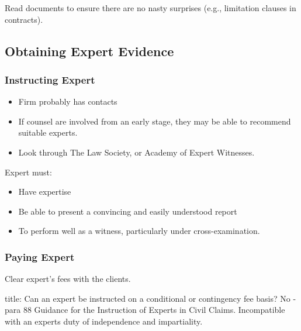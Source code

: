 \documentclass[
]{article}
\newenvironment{Shaded}{}{}
\newcommand{\NormalTok}[1]{#1}
\providecommand{\tightlist}{%
  \setlength{\itemsep}{0pt}\setlength{\parskip}{0pt}}
\begin{document}
Read documents to ensure there are no nasty surprises (e.g., limitation
clauses in contracts).

\hypertarget{obtaining-expert-evidence}{%
\subsection{Obtaining Expert Evidence}\label{obtaining-expert-evidence}}

\hypertarget{instructing-expert}{%
\subsubsection{Instructing Expert}\label{instructing-expert}}

\begin{itemize}
\tightlist
\item
  Firm probably has contacts
\item
  If counsel are involved from an early stage, they may be able to
  recommend suitable experts.
\item
  Look through The Law Society, or Academy of Expert Witnesses.
\end{itemize}

Expert must:

\begin{itemize}
\tightlist
\item
  Have expertise
\item
  Be able to present a convincing and easily understood report
\item
  To perform well as a witness, particularly under cross-examination.
\end{itemize}

\hypertarget{paying-expert}{%
\subsubsection{Paying Expert}\label{paying-expert}}

Clear expert's fees with the clients.

\begin{Shaded}
\begin{Highlighting}[]
\NormalTok{title: Can an expert be instructed on a conditional or contingency fee basis?}
\NormalTok{No {-} para 88 Guidance for the Instruction of Experts in Civil Claims. Incompatible with an expert\textquotesingle{}s duty of independence and impartiality. }
\end{Highlighting}
\end{Shaded}
\end{document}
